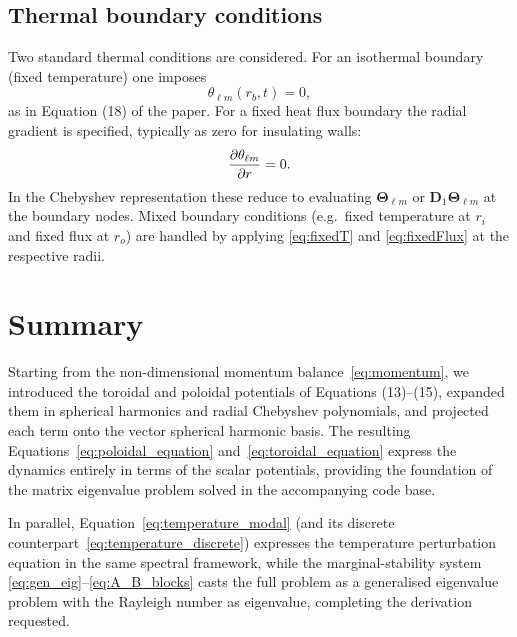 \documentclass[11pt]{article}
\numberwithin{equation}{section}
\begin{document}
\subsection{Thermal boundary conditions}
Two standard thermal conditions are considered. For an isothermal boundary (fixed temperature) one imposes
\begin{equation}
  \theta_{\ell m}(r_b, t) = 0,
  \label{eq:fixedT}
\end{equation}
as in Equation (18) of the paper. For a fixed heat flux boundary the radial gradient is specified, typically as zero for insulating walls:
\begin{equation}
  \pdv{\theta_{\ell m}}{r}(r_b, t) = 0.
  \label{eq:fixedFlux}
\end{equation}
In the Chebyshev representation these reduce to evaluating $\bm{\Theta}_{\ell m}$ or $\bm{D}_1 \bm{\Theta}_{\ell m}$ at the boundary nodes. Mixed boundary conditions (e.g.\ fixed temperature at $r_i$ and fixed flux at $r_o$) are handled by applying \eqref{eq:fixedT} and \eqref{eq:fixedFlux} at the respective radii.

\section{Summary}
Starting from the non-dimensional momentum balance~\eqref{eq:momentum}, we introduced the toroidal and poloidal potentials of Equations (13)--(15), expanded them in spherical harmonics and radial Chebyshev polynomials, and projected each term onto the vector spherical harmonic basis. The resulting Equations~\eqref{eq:poloidal_equation} and~\eqref{eq:toroidal_equation} express the dynamics entirely in terms of the scalar potentials, providing the foundation of the matrix eigenvalue problem solved in the accompanying code base.

\bigskip
In parallel, Equation~\eqref{eq:temperature_modal} (and its discrete counterpart~\eqref{eq:temperature_discrete}) expresses the temperature perturbation equation in the same spectral framework, while the marginal-stability system \eqref{eq:gen_eig}--\eqref{eq:A_B_blocks} casts the full problem as a generalised eigenvalue problem with the Rayleigh number as eigenvalue, completing the derivation requested.
\end{document}
